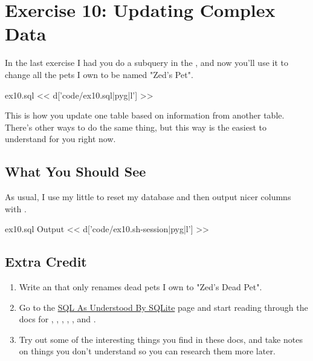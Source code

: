 \chapter{Exercise 10: Updating Complex Data}

In the last exercise I had you do a subquery in the , and now
you'll use it to change all the pets I own to be named "Zed's Pet".

\begin{code}{ex10.sql}
<< d['code/ex10.sql|pyg|l'] >>
\end{code}

This is how you update one table based on information from another table.
There's other ways to do the same thing, but this way is the easiest to
understand for you right now.

\section{What You Should See}

As usual, I use my little  to reset my database and then output
nicer columns with .

\begin{code}{ex10.sql Output}
<< d['code/ex10.sh-session|pyg|l'] >>
\end{code}


\section{Extra Credit}

\begin{enumerate}
\item Write an  that only renames dead pets I own to "Zed's Dead Pet".
\item Go to the \href{http://www.sqlite.org/lang.html}{SQL As Understood By SQLite}
    page and start reading through the docs for , , , , , and .
\item Try out some of the interesting things you find in these docs, and take notes
    on things you don't understand so you can research them more later.
\end{enumerate}


